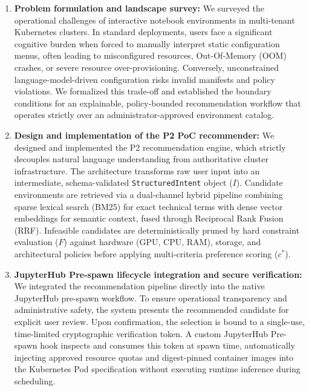 \begin{enumerate}
    \item \textbf{Problem formulation and landscape survey:} We surveyed the operational challenges of interactive notebook environments in multi-tenant Kubernetes clusters. In standard deployments, users face a significant cognitive burden when forced to manually interpret static configuration menus, often leading to misconfigured resources, Out-Of-Memory (OOM) crashes, or severe resource over-provisioning. Conversely, unconstrained language-model-driven configuration risks invalid manifests and policy violations. We formalized this trade-off and established the boundary conditions for an explainable, policy-bounded recommendation workflow that operates strictly over an administrator-approved environment catalog.

    \item \textbf{Design and implementation of the P2 PoC recommender:} We designed and implemented the P2 recommendation engine, which strictly decouples natural language understanding from authoritative cluster infrastructure. The architecture transforms raw user input into an intermediate, schema-validated \texttt{StructuredIntent} object ($I$). Candidate environments are retrieved via a dual-channel hybrid pipeline combining sparse lexical search (BM25) for exact technical terms with dense vector embeddings for semantic context, fused through Reciprocal Rank Fusion (RRF). Infeasible candidates are deterministically pruned by hard constraint evaluation ($F$) against hardware (GPU, CPU, RAM), storage, and architectural policies before applying multi-criteria preference scoring ($c^*$).

    \item \textbf{JupyterHub Pre-spawn lifecycle integration and secure verification:} We integrated the recommendation pipeline directly into the native JupyterHub pre-spawn workflow. To ensure operational transparency and administrative safety, the system presents the recommended candidate for explicit user review. Upon confirmation, the selection is bound to a single-use, time-limited cryptographic verification token. A custom JupyterHub Pre-spawn hook inspects and consumes this token at spawn time, automatically injecting approved resource quotas and digest-pinned container images into the Kubernetes Pod specification without executing runtime inference during scheduling.


\end{enumerate}
